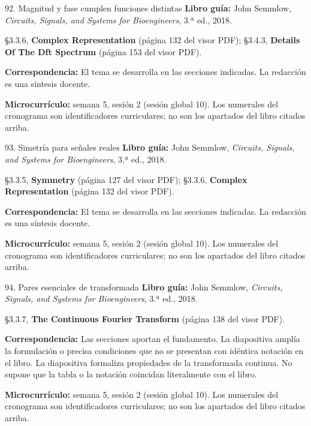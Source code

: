 \documentclass[
  10pt,
  ignorenonframetext,
  aspectratio=169,
  spanish,
]{beamer}
\begin{document}
\begin{frame}{92. Magnitud y fase cumplen funciones distintas}
\label{magnitud-y-fase-cumplen-funciones-distintas}
\textbf{Libro guía:} John Semmlow, \emph{Circuits, Signals, and Systems
for Bioengineers}, 3.ª ed., 2018.

§3.3.6, \textbf{Complex Representation} (página 132 del visor PDF);
§3.4.3, \textbf{Details Of The Dft Spectrum} (página 153 del visor PDF).

\textbf{Correspondencia:} El tema se desarrolla en las secciones
indicadas. La redacción es una síntesis docente.

\textbf{Microcurrículo:} semana 5, sesión 2 (sesión global 10). Los
numerales del cronograma son identificadores curriculares; no son los
apartados del libro citados arriba.
\end{frame}

\begin{frame}{93. Simetría para señales reales}
\label{simetruxeda-para-seuxf1ales-reales}
\textbf{Libro guía:} John Semmlow, \emph{Circuits, Signals, and Systems
for Bioengineers}, 3.ª ed., 2018.

§3.3.5, \textbf{Symmetry} (página 127 del visor PDF); §3.3.6,
\textbf{Complex Representation} (página 132 del visor PDF).

\textbf{Correspondencia:} El tema se desarrolla en las secciones
indicadas. La redacción es una síntesis docente.

\textbf{Microcurrículo:} semana 5, sesión 2 (sesión global 10). Los
numerales del cronograma son identificadores curriculares; no son los
apartados del libro citados arriba.
\end{frame}

\begin{frame}{94. Pares esenciales de transformada}
\label{pares-esenciales-de-transformada}
\textbf{Libro guía:} John Semmlow, \emph{Circuits, Signals, and Systems
for Bioengineers}, 3.ª ed., 2018.

§3.3.7, \textbf{The Continuous Fourier Transform} (página 138 del visor
PDF).

\textbf{Correspondencia:} Las secciones aportan el fundamento. La
diapositiva amplía la formulación o precisa condiciones que no se
presentan con idéntica notación en el libro. La diapositiva formaliza
propiedades de la transformada continua. No supone que la tabla o la
notación coincidan literalmente con el libro.

\textbf{Microcurrículo:} semana 5, sesión 2 (sesión global 10). Los
numerales del cronograma son identificadores curriculares; no son los
apartados del libro citados arriba.
\end{frame}
\end{document}
